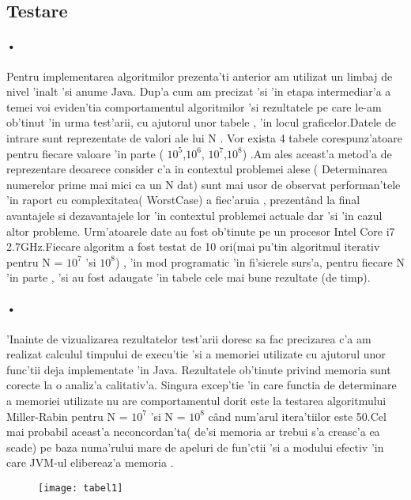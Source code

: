 \documentclass[12pt,twoside]{article}
\numberwithin{figure}{section}
\begin{document}
\subsection{Testare}
\paragraph{•}
Pentru implementarea algoritmilor prezenta'ti anterior am utilizat un limbaj de nivel 'inalt 'si anume Java.
Dup'a cum am precizat 'si 'in etapa intermediar'a a temei voi eviden'tia comportamentul algoritmilor 'si rezultatele pe care le-am ob'tinut 'in urma test'arii, cu ajutorul unor tabele , 'in locul graficelor.Datele de intrare sunt reprezentate de valori ale lui N . Vor exista 4 tabele corespunz'atoare pentru fiecare valoare 'in parte ( $10^5$,$10^6$, $10^7$,$10^8$) .Am ales aceast'a metod'a de reprezentare deoarece consider c'a in contextul problemei alese ( Determinarea numerelor prime mai mici ca un N dat) sunt mai usor de observat performan'tele 'in raport cu complexitatea( WorstCase) a fiec'aruia , prezent\^and la final avantajele si dezavantajele lor 'in contextul problemei actuale dar 'si 'in cazul altor probleme.  Urm'atoarele date au fost  ob'tinute pe un procesor Intel Core i7 2.7GHz.Fiecare algoritm a fost testat de 10 ori(mai pu'tin algoritmul iterativ pentru N = $10^7$ 'si $10^8$) , 'in mod programatic 'in fi'sierele surs'a, pentru fiecare N 'in parte , 'si au fost adaugate 'in tabele cele mai bune rezultate (de timp). 
\paragraph{•}
'Inainte de vizualizarea rezultatelor test'arii doresc sa fac precizarea c'a am realizat calculul timpului de execu'tie 'si a memoriei utilizate cu ajutorul unor func'tii deja implementate 'in Java. Rezultatele ob'tinute privind memoria sunt corecte la o analiz'a calitativ'a. Singura excep'tie 'in care functia de determinare a memoriei utilizate nu are comportamentul dorit este la testarea algoritmului Miller-Rabin pentru N = $10^7$ 'si N = $10^8$ c\^and num'arul itera'tiilor este 50.Cel mai probabil aceast'a neconcordan'ta( de'si memoria ar trebui s'a creasc'a ea scade) pe baza numa'rului mare de apeluri de fun'ctii 'si a modului efectiv 'in care JVM-ul elibereaz'a memoria . 

\begin{figure}
\centering
\texttt{[image: tabel1]}
\caption{}   
\end{figure}
\end{document}
